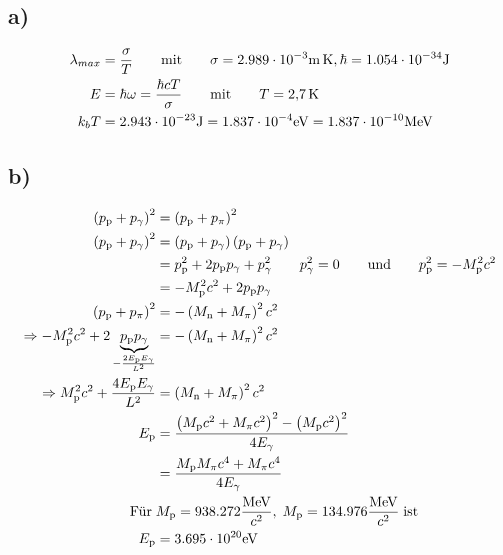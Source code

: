 \subsection{a)}

    \begin{align}
        \lambda_{max} &= \frac{\sigma}{T} \qquad \text{mit} \qquad \sigma = \text{$2.989\cdot 10^{-3}$\SI{}{\meter\kelvin}}, \hbar = \text{$1.054\cdot 10^{-34}$\SI{}{\joule}}\\
        E &= \hbar \omega = \frac{\hbar c T}{\sigma} \qquad \text{mit} \qquad T = \text{\SI{2.7}{\kelvin}}\\
        k_b T &= 2.943\cdot 10^{-23}\text{\SI{}{\joule}} = 1.837\cdot 10^{-4}\text{\SI{}{\electronvolt}} = 1.837\cdot 10^{-10}\text{\SI{}{\mega\electronvolt}}
    \end{align}

\subsection{b)}

    \begin{align}
        \left( p_{\text{p}} + p_{\gamma} \right)^2 &= \left( p_{\text{p}} + p_{\pi} \right)^2\\
        \left( p_{\text{p}} + p_{\gamma} \right)^2 &= \left( p_{\text{p}} + p_{\gamma} \right) \left( p_{\text{p}} + p_{\gamma} \right)\\
        &= p_{\text{p}}^2 + 2p_{\text{p}}p_{\gamma} + p_{\gamma}^2 \qquad p_{\gamma}^2=0 \qquad \text{und} \qquad p_{\text{p}}^2 = -M_{\text{p}}^2c^2\\
        &= -M_{\text{p}}^2c^2 + 2p_{\text{p}}p_{\gamma}\\
        \left( p_{\text{p}} + p_{\pi} \right)^2 &= -\left( M_{\text{n}} + M_{\pi} \right)^2c^2\\
        \Rightarrow -M_{\text{p}}^2c^2 + 2\underbrace{p_{\text{p}}p_{\gamma}}_{-\frac{2E_{\text{p}} E_{\gamma}}{L^2}} &=  -\left( M_{\text{n}} + M_{\pi} \right)^2c^2\\
        \Rightarrow M_{\text{p}}^2c^2 + \frac{4E_{\text{p}} E_{\gamma}}{L^2}  &=  \left( M_{\text{n}} + M_{\pi} \right)^2c^2\\
        E_{\text{p}} &= \frac{ \left( M_{\text{p}} c^2 + M_{\pi} c^2 \right)^2 - \left( M_{\text{p}} c^2 \right)^2}{4E_{\gamma}}\\
        &= \frac{M_{\text{p}} M_{\pi} c^4 + M_{\pi} c^4}{4E_{\gamma}}\\
        \text{Für}\; &M_{\text{p}} = 938.272 \frac{\text{\SI{}{\mega\electronvolt}}}{c^2},\;
        M_{\text{p}} = 134.976 \frac{\text{\SI{}{\mega\electronvolt}}}{c^2}\; \text{ist}\\
        E_{\text{p}} &= 3.695 \cdot 10^{20} \text{\SI{}{\electronvolt}}
    \end{align}

